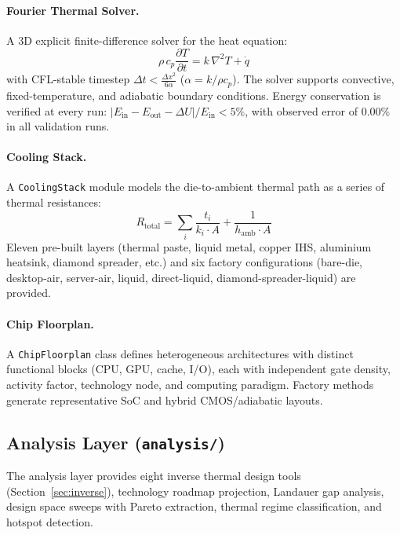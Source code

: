 \documentclass[11pt,twocolumn]{article}
\begin{document}
\paragraph{Fourier Thermal Solver.}
A 3D explicit finite-difference solver for the heat equation:
\begin{equation}
  \rho \, c_p \frac{\partial T}{\partial t}
    = k \, \nabla^2 T + \dot{q}
  \label{eq:fourier}
\end{equation}
with CFL-stable timestep $\Delta t < \tfrac{\Delta x^2}{6\alpha}$
($\alpha = k / \rho c_p$). The solver supports convective, fixed-temperature,
and adiabatic boundary conditions. Energy conservation is verified at every
run: $|E_{\mathrm{in}} - E_{\mathrm{out}} - \Delta U| / E_{\mathrm{in}} < 5\%$,
with observed error of 0.00\% in all validation runs.

\paragraph{Cooling Stack.}
A \texttt{CoolingStack} module models the die-to-ambient thermal path
as a series of thermal resistances:
\begin{equation}
  R_{\mathrm{total}} = \sum_i \frac{t_i}{k_i \cdot A} + \frac{1}{h_{\mathrm{amb}} \cdot A}
  \label{eq:rstack}
\end{equation}
Eleven pre-built layers (thermal paste, liquid metal, copper IHS,
aluminium heatsink, diamond spreader, etc.) and six factory
configurations (bare-die, desktop-air, server-air, liquid, direct-liquid,
diamond-spreader-liquid) are provided.

\paragraph{Chip Floorplan.}
A \texttt{ChipFloorplan} class defines heterogeneous architectures
with distinct functional blocks (CPU, GPU, cache, I/O), each with
independent gate density, activity factor, technology node, and
computing paradigm. Factory methods generate representative SoC and
hybrid CMOS/adiabatic layouts.

\subsection{Analysis Layer (\texttt{analysis/})}

The analysis layer provides eight inverse thermal design tools
(Section~\ref{sec:inverse}), technology roadmap projection, Landauer
gap analysis, design space sweeps with Pareto extraction, thermal
regime classification, and hotspot detection.
\end{document}

